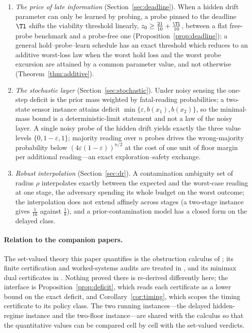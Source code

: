 \begin{enumerate}[leftmargin=1.6em,itemsep=1pt]
\item \emph{The price of late information} (Section~\ref{sec:deadline}). When a hidden drift parameter can only be learned by probing, a probe pinned to the deadline $\Tl$ shifts the viability threshold linearly, $z_0\ge\tfrac{21}{10}+\tfrac{\Tl}{10}$, between a flat free-probe benchmark and a probe-free one (Proposition~\ref{prop:deadline}); a general hold--probe--learn schedule has an exact threshold which reduces to an additive worst-loss law when the worst hold loss and the worst probe excursion are attained by a common parameter value, and not otherwise (Theorem~\ref{thm:additive}).
\item \emph{The stochastic layer} (Section~\ref{sec:stochastic}). Under noisy sensing the one-step deficit is the prior mass weighted by fatal-reading probabilities; a two-state sensor instance attains deficit $\min\{\varepsilon,b(x_1),b(x_2)\}$, so the minimal-mass bound is a deterministic-limit statement and not a law of the noisy layer. A single noisy probe of the hidden drift yields exactly the three value levels $\{0,1-\varepsilon,1\}$; majority reading over $n$ probes drives the wrong-majority probability below $(4\varepsilon(1-\varepsilon))^{n/2}$ at the cost of one unit of floor margin per additional reading---an exact exploration--safety exchange.
\item \emph{Robust interpolation} (Section~\ref{sec:dr}). A contamination ambiguity set of radius $\rho$ interpolates exactly between the expected and the worst-case reading at one stage, the adversary spending its whole budget on the worst outcome; the interpolation does not extend affinely across stages (a two-stage instance gives $\tfrac1{16}$ against $\tfrac18$), and a prior-contamination model has a closed form on the delayed class.
\end{enumerate}

\paragraph{Relation to the companion papers.}
The set-valued theory this paper quantifies is the obstruction calculus of \cite{Abaee2026calc}; its finite certification and worked-systems audits are treated in \cite{Abaee2026cert,Abaee2026worked}, and its minimax dual certificates in \cite{Abaee2026minimax}. Nothing proved there is re-derived differently here; the interface is Proposition~\ref{prop:deficit}, which reads each certificate as a lower bound on the exact deficit, and Corollary~\ref{cor:timing}, which scopes the timing certificate to its policy class. The two running instances---the delayed hidden-regime instance and the two-floor instance---are shared with the calculus so that the quantitative values can be compared cell by cell with the set-valued verdicts.

